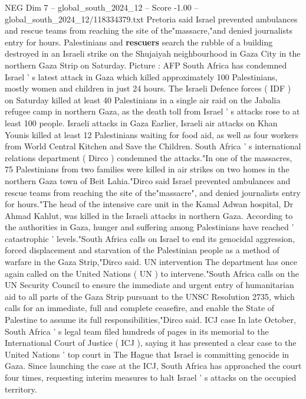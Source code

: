 \begin{textsample}{NEG Dim 7 – global\_south\_2024\_12 – Score -1.00 – global\_south\_2024\_12/118334379.txt}  \label{ex:f7_neg_100}
Pretoria said Israel prevented ambulances and rescue teams from reaching the site of the"massacre,"and denied journalists entry for hours.
Palestinians and \textbf{rescuers} search the rubble of a building destroyed in an Israeli strike on the Shujaiyah neighbourhood in Gaza City in the northern Gaza Strip on Saturday.
Picture : AFP South Africa has condemned Israel ' s latest attack in Gaza which killed approximately 100 Palestinians, mostly women and children in just 24 hours.
The Israeli Defence forces ( IDF ) on Saturday killed at least 40 Palestinians in a single air raid on the Jabalia refugee camp in northern Gaza, as the death toll from Israel ' s attacks rose to at least 100 people.
Israeli attacks in Gaza Earlier, Israeli air attacks on Khan Younis killed at least 12 Palestinians waiting for food aid, as well as four workers from World Central Kitchen and Save the Children.
South Africa ' s international relations department ( Dirco ) condemned the attacks."In one of the massacres, 75 Palestinians from two families were killed in air strikes on two homes in the northern Gaza town of Beit Lahia."Dirco said Israel prevented ambulances and rescue teams from reaching the site of the"massacre", and denied journalists entry for hours."The head of the intensive care unit in the Kamal Adwan hospital, Dr Ahmad Kahlut, was killed in the Israeli attacks in northern Gaza.
According to the authorities in Gaza, hunger and suffering among Palestinians have reached ' catastrophic ' levels."South Africa calls on Israel to end its genocidal aggression, forced displacement and starvation of the Palestinian people as a method of warfare in the Gaza Strip,"Dirco said.
UN intervention The department has once again called on the United Nations ( UN ) to intervene."South Africa calls on the UN Security Council to ensure the immediate and urgent entry of humanitarian aid to all parts of the Gaza Strip pursuant to the UNSC Resolution 2735, which calls for an immediate, full and complete ceasefire, and enable the State of Palestine to assume its full responsibilities,"Dirco said.
ICJ case In late October, South Africa ' s legal team filed hundreds of pages in its memorial to the International Court of Justice ( ICJ ), saying it has presented a clear case to the United Nations ' top court in The Hague that Israel is committing genocide in Gaza.
Since launching the case at the ICJ, South Africa has approached the court four times, requesting interim measures to halt Israel ' s attacks on the occupied territory.

\end{textsample}
